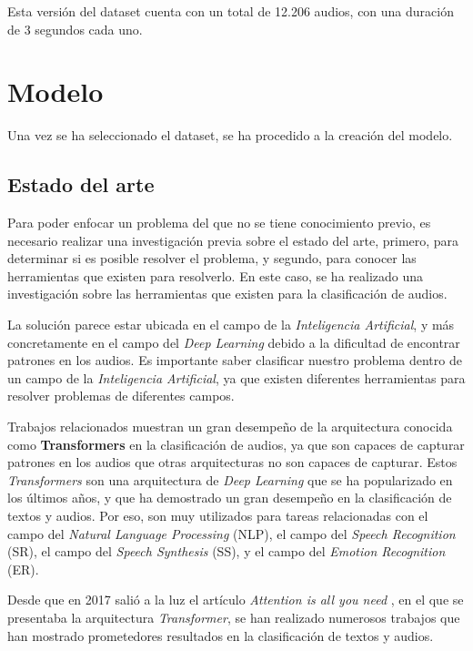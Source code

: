 Esta versión del dataset cuenta con un total de 12.206 audios, con una duración de 3 segundos cada uno.

\section{Modelo}\label{seccion:modelo}
Una vez se ha seleccionado el dataset, se ha procedido a la creación del modelo.

\subsection{Estado del arte}\label{seccion:estado-del-arte}
Para poder enfocar un problema del que no se tiene conocimiento previo, es necesario realizar una investigación previa sobre el estado del arte, primero, para determinar si es posible resolver el problema, y segundo, para conocer las herramientas que existen para resolverlo.
En este caso, se ha realizado una investigación sobre las herramientas que existen para la clasificación de audios.

La solución parece estar ubicada en el campo de la \textit{Inteligencia Artificial}, y más concretamente en el campo del \textit{Deep Learning} debido a la dificultad de encontrar patrones en los audios.
Es importante saber clasificar nuestro problema dentro de un campo de la \textit{Inteligencia Artificial}, ya que existen diferentes herramientas para resolver problemas de diferentes campos.

Trabajos relacionados muestran un gran desempeño de la arquitectura conocida como \textbf{Transformers} en la clasificación de audios, ya que son capaces de capturar patrones en los audios que otras arquitecturas no son capaces de capturar.
Estos \textit{Transformers} son una arquitectura de \textit{Deep Learning} que se ha popularizado en los últimos años, y que ha demostrado un gran desempeño en la clasificación de textos y audios.
Por eso, son muy utilizados para tareas relacionadas con el campo del \textit{Natural Language Processing} (NLP), el campo del \textit{Speech Recognition} (SR), el campo del \textit{Speech Synthesis} (SS), y el campo del \textit{Emotion Recognition} (ER).

Desde que en 2017 salió a la luz el artículo \textit{Attention is all you need} \cite{vaswani2023attention}, en el que se presentaba la arquitectura \textit{Transformer}, se han realizado numerosos trabajos que han mostrado prometedores resultados en la clasificación de textos y audios. \cite{standfordCS224N} \cite{sullivan2022improving}

